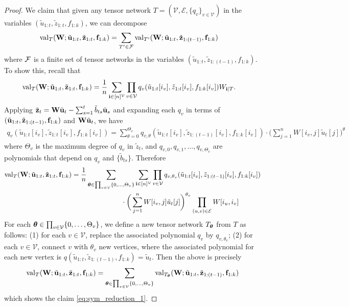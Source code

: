 \documentclass[10pt,reqno]{amsart}
\def\cV{\mathcal{V}}
\def\cE{\mathcal{E}}
\def\val{\operatorname{val}}
\def\bW{{\mathbf{W}}}
\def\bi{\mathbf{i}}
\begin{document}
\begin{proof}
We claim that given any tensor network $T=(\cV,\cE,\{q_v\}_{v \in \cV})$
in the variables $(\tilde u_{1:t},\tilde z_{1:t},f_{1:k})$, we can decompose
\begin{align}\label{eq:sym_reduction_1}
\val_T(\bW; \tilde\ub_{1:t}, \tilde\zb_{1:t}, \fb_{1:k}) 
&= \sum_{T' \in \cF} \val_{T'}(\bW; \tilde\ub_{1:t}, \tilde\zb_{1:(t-1)}, \fb_{1:k})
\end{align}
where $\mathcal{F}$ is a finite set of tensor networks in the variables
$(\tilde u_{1:t}, \tilde z_{1:(t-1)}, f_{1:k})$. 
To show this, recall that
\begin{align*}
\val_T(\bW; \tilde\ub_{1:t}, \tilde\zb_{1:t}, \fb_{1:k})
&= \frac{1}{n}\sum_{\bi \in [n]^\cV} \prod_{v \in \cV}
q_v(\tilde u_{1:t}[i_v], \tilde z_{1:t}[i_v], f_{1:k}[i_v]) W_{\bi|T}.
\end{align*}
Applying $\tilde\zb_t = \bW \tilde\ub_t 
- \sum_{s=1}^t \tilde b_{ts} \tilde\ub_s$ and
expanding each $q_v$ in terms of $(\tilde{\mathbf{u}}_{1:t}, \tilde{\mathbf{z}}_{1:(t-1)}, 
\mathbf{f}_{1:k})$ and $\bW\tilde \ub_t$, we have 
\begin{align*}
q_v(\tilde u_{1:t}[i_v], \tilde z_{1:t}[i_v], f_{1:k}[i_v]) = 
\sum_{\theta=0}^{\Theta_v} q_{v,\theta}(\tilde u_{1:t}[i_v], 
\tilde z_{1:(t-1)}[i_v], f_{1:k}[i_v]) 
\cdot \bigg(\sum_{j=1}^n W[i_v, j] \tilde u_t[j]\bigg)^\theta
\end{align*}
where $\Theta_v$ is the maximum degree of $q_v$ in $\tilde z_t$, and $q_{v,0},
q_{v,1}, \ldots, q_{v, \Theta_v}$ are polynomials that depend on $q_v$ and 
$\{\tilde b_{ts}\}$.
Therefore
\begin{align*}
\val_T(\bW; \tilde\ub_{1:t}, \tilde\zb_{1:t}, \fb_{1:k}) 
&=\frac{1}{n} \sum_{\btheta \in \prod_{v \in \cV} \{0,\ldots,\Theta_v\}}
\sum_{\bi \in [n]^\cV} \prod_{v \in \cV} q_{v,\theta_v}
(\tilde u_{1:t}[i_v], \tilde z_{1:(t-1)}[i_v], f_{1:k}[i_v])\notag\\
&\hspace{1in}\cdot \bigg(\sum_{j=1}^n W[i_v, j] \tilde u_t[j]\bigg)^{\theta_v} 
\prod_{(u,v)\in \cE} W[i_u,i_v]
\end{align*}
For each $\btheta \in \prod_{v\in\cV} \{0,\ldots,\Theta_v\}$, we define a new 
tensor network $T_{\bm{\theta}}$ from $T$ as follows: (1) for each $v \in \cV$, 
replace the associated polynomial $q_v$ by $q_{v, \theta_v}$; (2) for each 
$v \in \cV$, connect $v$ with $\theta_v$ new vertices, where the associated 
polynomial for each new vertex is 
$q(\tilde u_{1:t}, \tilde z_{1:(t-1)}, f_{1:k}) = \tilde u_t$.
Then the above is precisely
\begin{align*}
\val_T(\bW; \tilde\ub_{1:t}, \tilde\zb_{1:t}, \fb_{1:k}) = 
\sum_{\btheta \in \prod_{v \in \cV}\{0,\ldots,\Theta_v\}}
\val_{T_{\btheta}}(\bW; \tilde\ub_{1:t}, \tilde\zb_{1:(t-1)}, \fb_{1:k})
\end{align*}
which shows the claim \eqref{eq:sym_reduction_1}.


\end{proof}
\end{document}
